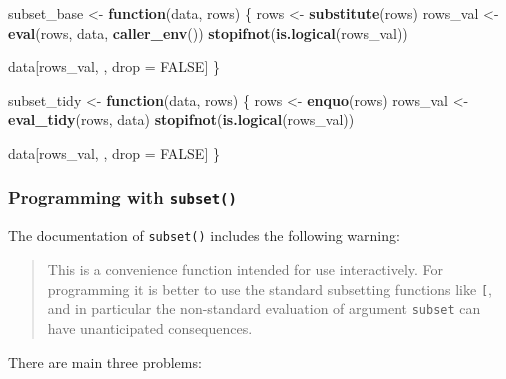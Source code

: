 \documentclass[]{book}
\makeatletter
\newenvironment{Shaded}{\begin{snugshade}}{\end{snugshade}}
\newcommand{\ControlFlowTok}[1]{\textcolor[rgb]{0.27,0.27,0.27}{\textbf{#1}}}
\newcommand{\KeywordTok}[1]{\textcolor[rgb]{0.27,0.27,0.27}{\textbf{#1}}}
\newcommand{\NormalTok}[1]{#1}
\newcommand{\OtherTok}[1]{\textcolor[rgb]{0.37,0.37,0.37}{#1}}
\newcommand{\StringTok}[1]{\textcolor[rgb]{0.5,0.5,0.5}{#1}}
\newcommand{\indexc}[1]{\index{#1@\texttt{#1}}}
\makeatother
\begin{document}
\begin{Shaded}
\begin{Highlighting}[]
\NormalTok{subset_base <-}\StringTok{ }\ControlFlowTok{function}\NormalTok{(data, rows) \{}
\NormalTok{  rows <-}\StringTok{ }\KeywordTok{substitute}\NormalTok{(rows)}
\NormalTok{  rows_val <-}\StringTok{ }\KeywordTok{eval}\NormalTok{(rows, data, }\KeywordTok{caller_env}\NormalTok{())}
  \KeywordTok{stopifnot}\NormalTok{(}\KeywordTok{is.logical}\NormalTok{(rows_val))}

\NormalTok{  data[rows_val, , drop =}\StringTok{ }\OtherTok{FALSE}\NormalTok{]}
\NormalTok{\}}

\NormalTok{subset_tidy <-}\StringTok{ }\ControlFlowTok{function}\NormalTok{(data, rows) \{}
\NormalTok{  rows <-}\StringTok{ }\KeywordTok{enquo}\NormalTok{(rows)}
\NormalTok{  rows_val <-}\StringTok{ }\KeywordTok{eval_tidy}\NormalTok{(rows, data)}
  \KeywordTok{stopifnot}\NormalTok{(}\KeywordTok{is.logical}\NormalTok{(rows_val))}

\NormalTok{  data[rows_val, , drop =}\StringTok{ }\OtherTok{FALSE}\NormalTok{]}
\NormalTok{\}}
\end{Highlighting}
\end{Shaded}

\hypertarget{programming-with-subset}{%
\subsubsection{\texorpdfstring{Programming with \texttt{subset()}}{Programming with subset()}}\label{programming-with-subset}}

\indexc{subset()}

The documentation of \texttt{subset()} includes the following warning:

\begin{quote}
This is a convenience function intended for use interactively. For
programming it is better to use the standard subsetting functions like \texttt{{[}},
and in particular the non-standard evaluation of argument \texttt{subset} can have
unanticipated consequences.
\end{quote}

There are main three problems:
\end{document}
